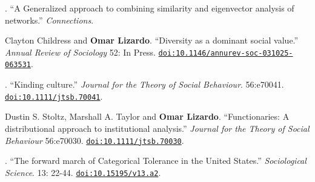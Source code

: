 

. ``A Generalized approach to combining similarity and eigenvector analysis of networks.'' {\em Connections}.

\ind Clayton Childress and {\bf Omar Lizardo}. ``Diversity as a dominant social value.'' {\em Annual Review of Sociology} 52: In Press. \href{https://doi.org/10.1146/annurev-soc-031025-063531}{\nolinkurl{doi:10.1146/annurev-soc-031025-063531}}.

. ``Kinding culture.'' {\em Journal for the Theory of Social Behaviour}. 56:e70041. \href{https://doi.org/10.1111/jtsb.70041}{\nolinkurl{doi:10.1111/jtsb.70041}}.

\ind Dustin S. Stoltz, Marshall A. Taylor and {\bf Omar Lizardo}. ``Functionaries: A distributional approach to institutional analysis.'' {\em Journal for the Theory of Social Behaviour} 56:e70030. \href{https://doi.org/10.1111/jtsb.70030}{\nolinkurl{doi:10.1111/jtsb.70030}}.

. ``The forward march of Categorical Tolerance in the United States.'' {\em Sociological Science}. 13:
22-44. \href{https://doi.org/10.15195/v13.a2}{\nolinkurl{doi:10.15195/v13.a2}}.

 



